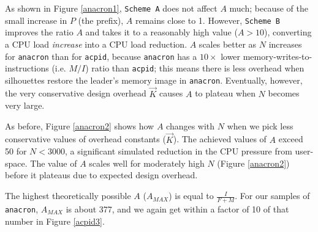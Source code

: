 As shown in Figure \ref{anacron1}, \texttt{Scheme A}
does not affect $A$ much; because of the small increase
in $P$ (the prefix), $A$ remains close to 1.
However, \texttt{Scheme B} improves the ratio $A$ and
takes it to a reasonably high value ($A > 10$), converting a CPU load {\em increase}
into a CPU load reduction. $A$ scales better as $N$ increases for \texttt{anacron}
than for \texttt{acpid}, because \texttt{anacron} has 
a $10\times$ lower memory-writes-to-instructions (i.e. $M/I$) ratio 
than \texttt{acpid}; this means there is less 
overhead when silhouettes restore the leader's memory image 
in \texttt{anacron}.  Eventually, however, the 
very conservative design overhead $\vec K$
causes $A$ to plateau when $N$ becomes very large.

As before, Figure \ref{anacron2} shows how $A$ changes with $N$ when we pick less conservative
values of overhead constants ($\vec K$). The achieved values of $A$ 
exceed 50 for $N < 3000$, a significant simulated reduction in the CPU
pressure from user-space. The value of $A$ scales well for moderately high $N$
(Figure \ref{anacron2}) before it plateaus due
to expected design overhead.

The highest theoretically possible
$A$ ($A_{MAX}$) is equal to $\frac{I}{F+M}$. For our samples of \texttt{anacron}, $A_{MAX}$ 
is about 377, and we again get within a factor of 10 of that number in Figure \ref{acpid3}. 

